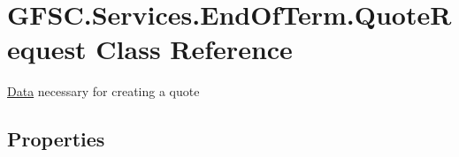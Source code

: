 \hypertarget{class_g_f_s_c_1_1_services_1_1_end_of_term_1_1_quote_request}{}\section{G\+F\+S\+C.\+Services.\+End\+Of\+Term.\+Quote\+Request Class Reference}
\label{class_g_f_s_c_1_1_services_1_1_end_of_term_1_1_quote_request}


\mbox{\hyperlink{namespace_g_f_s_c_1_1_services_1_1_end_of_term_1_1_data}{Data}} necessary for creating a quote  


\subsection*{Properties}
